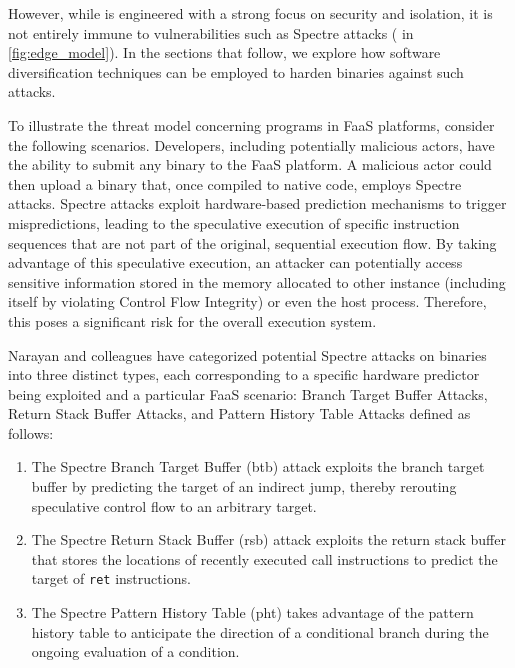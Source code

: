 However, while \Wasm is engineered with a strong focus on security and isolation, it is not entirely immune to vulnerabilities such as Spectre attacks \cite{Spectre,Narayan2021Swivel} ( in \autoref{fig:edge_model}). 
In the sections that follow, we explore how software diversification techniques can be employed to harden \Wasm binaries against such attacks.


To illustrate the threat model concerning \Wasm programs in FaaS platforms, consider the following scenarios. 
Developers, including potentially malicious actors, have the ability to submit any \Wasm binary to the FaaS platform. 
A malicious actor could then upload a \Wasm binary that, once compiled to native code, employs Spectre attacks.
Spectre attacks exploit hardware-based prediction mechanisms to trigger mispredictions, leading to the speculative execution of specific instruction sequences that are not part of the original, sequential execution flow. 
By taking advantage of this speculative execution, an attacker can potentially access sensitive information stored in the memory allocated to other \Wasm instance (including itself by violating Control Flow Integrity) or even the host process. 
Therefore, this poses a significant risk for the overall execution system.

Narayan and colleagues \cite{Narayan2021Swivel} have categorized potential Spectre attacks on \Wasm binaries into three distinct types, each corresponding to a specific hardware predictor being exploited and a particular FaaS scenario: Branch Target Buffer Attacks,  Return Stack Buffer Attacks, and Pattern History Table Attacks defined as follows:

\begin{enumerate}
    \item The Spectre Branch Target Buffer (btb) attack exploits the branch target buffer by predicting the target of an indirect jump, thereby rerouting speculative control flow to an arbitrary target.
    \item  The Spectre Return Stack Buffer (rsb) attack exploits the return stack buffer that stores the locations of recently executed call instructions to predict the target of \texttt{ret} instructions.
    \item The Spectre Pattern History Table (pht) takes advantage of the pattern history table to anticipate the direction of a conditional branch during the ongoing evaluation of a condition.
\end{enumerate}



